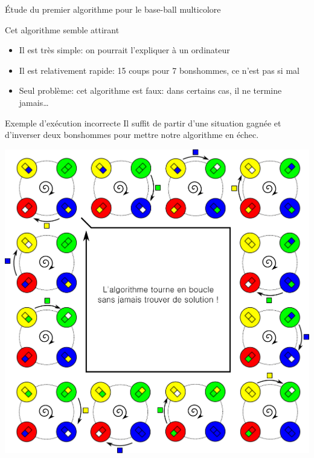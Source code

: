 \begin{frame}{Étude du premier algorithme pour le base-ball multicolore}
  \begin{block}{Cet algorithme semble attirant}
    \begin{itemize}
    \item Il est très simple: on pourrait l'expliquer à un ordinateur
    \item Il est relativement rapide: 15 coups pour 7 bonshommes, ce n'est pas si mal
    \item Seul problème: cet algorithme est faux: dans certains cas, il ne termine jamais\ldots
    \end{itemize}
  \end{block}

  \begin{block}{Exemple d'exécution incorrecte}
    Il suffit de partir d'une situation gagnée et d'inverser deux bonshommes pour mettre notre algorithme en échec.
\end{block}

  \begin{center}
    \includegraphics[width=0.8\linewidth]{img/baseball_ex2.pdf}
  \end{center}

\end{frame}

